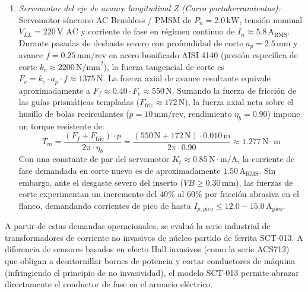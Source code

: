 \begin{enumerate}
    \item \textit{Servomotor del eje de avance longitudinal Z (Carro portaherramientas):} Servomotor síncrono AC Brushless / PMSM de $P_n = 2.0\,\text{kW}$, tensión nominal $V_{LL} = 220\,\text{V AC}$ y corriente de fase en régimen continuo de $I_n \approx 5.8\,\text{A}_{\text{RMS}}$. Durante pasadas de desbaste severo con profundidad de corte $a_p = 2.5\,\text{mm}$ y avance $f = 0.25\,\text{mm/rev}$ en acero bonificado AISI 4140 (presión específica de corte $k_c \approx 2200\,\text{N/mm}^2$), la fuerza tangencial de corte es $F_c = k_c \cdot a_p \cdot f \approx 1375\,\text{N}$. La fuerza axial de avance resultante equivale aproximadamente a $F_f \approx 0.40 \cdot F_c \approx 550\,\text{N}$. Sumando la fuerza de fricción de las guías prismáticas templadas ($F_{\text{fric}} \approx 172\,\text{N}$), la fuerza axial neta sobre el husillo de bolas recirculantes ($p = 10\,\text{mm/rev}$, rendimiento $\eta_b = 0.90$) impone un torque resistente de:
    \begin{equation}
    T_m = \frac{(F_f + F_{\text{fric}}) \cdot p}{2\pi \cdot \eta_b} = \frac{(550\,\text{N} + 172\,\text{N}) \cdot 0.010\,\text{m}}{2\pi \cdot 0.90} \approx 1.277\,\text{N}\cdot\text{m}
    \label{eq:mp_torque_avance}
    \end{equation}
    Con una constante de par del servomotor $K_t \approx 0.85\,\text{N}\cdot\text{m/A}$, la corriente de fase demandada en corte nuevo es de aproximadamente $1.50\,\text{A}_{\text{RMS}}$. Sin embargo, ante el desgaste severo del inserto ($VB \ge 0.30\,\text{mm}$), las fuerzas de corte experimentan un incremento del $40\%$ al $60\%$ por fricción abrasiva en el flanco, demandando corrientes de pico de hasta $I_{p,\text{pico}} \le 12.0 - 15.0\,\text{A}_{\text{pico}}$.
\end{enumerate}

A partir de estas demandas operacionales, se evaluó la serie industrial de transformadores de corriente no invasivos de núcleo partido de ferrita SCT-013. A diferencia de sensores basados en efecto Hall invasivos (como la serie ACS712) que obligan a desatornillar bornes de potencia y cortar conductores de máquina (infringiendo el principio de no invasividad), el modelo SCT-013 permite abrazar directamente el conductor de fase en el armario eléctrico.

